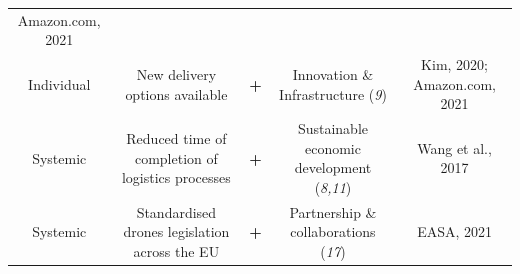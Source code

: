 \documentclass[
]{book}
\begin{document}
\begin{longtable}[]{@{}ccccc@{}}
\begin{minipage}[t]{0.17\columnwidth}
Amazon.com, 2021\strut
\end{minipage}\tabularnewline
\begin{minipage}[t]{0.17\columnwidth}\centering
Individual\strut
\end{minipage} & \begin{minipage}[t]{0.16\columnwidth}\centering
New delivery options available\strut
\end{minipage} & \begin{minipage}[t]{0.17\columnwidth}\centering
\textbf{+}\strut
\end{minipage} & \begin{minipage}[t]{0.17\columnwidth}\centering
Innovation \& Infrastructure (\emph{9})\strut
\end{minipage} & \begin{minipage}[t]{0.17\columnwidth}\centering
Kim, 2020; Amazon.com, 2021\strut
\end{minipage}\tabularnewline
\begin{minipage}[t]{0.17\columnwidth}\centering
Systemic\strut
\end{minipage} & \begin{minipage}[t]{0.16\columnwidth}\centering
Reduced time of completion of logistics processes\strut
\end{minipage} & \begin{minipage}[t]{0.17\columnwidth}\centering
\textbf{+}\strut
\end{minipage} & \begin{minipage}[t]{0.17\columnwidth}\centering
Sustainable economic development (\emph{8,11})\strut
\end{minipage} & \begin{minipage}[t]{0.17\columnwidth}\centering
Wang et al., 2017\strut
\end{minipage}\tabularnewline
\begin{minipage}[t]{0.17\columnwidth}\centering
Systemic\strut
\end{minipage} & \begin{minipage}[t]{0.16\columnwidth}\centering
Standardised drones legislation across the EU\strut
\end{minipage} & \begin{minipage}[t]{0.17\columnwidth}\centering
\textbf{+}\strut
\end{minipage} & \begin{minipage}[t]{0.17\columnwidth}\centering
Partnership \& collaborations (\emph{17})\strut
\end{minipage} & \begin{minipage}[t]{0.17\columnwidth}\centering
EASA, 2021\strut
\end{minipage}\tabularnewline
\bottomrule
\end{longtable}
\end{document}
